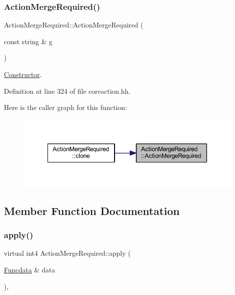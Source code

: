 \subsubsection{\texorpdfstring{ActionMergeRequired()}{ActionMergeRequired()}}
{\footnotesize\ttfamily Action\+Merge\+Required\+::\+Action\+Merge\+Required (\begin{DoxyParamCaption}\item[{const string \&}]{g }\end{DoxyParamCaption})\hspace{0.3cm}{\ttfamily [inline]}}



\mbox{\hyperlink{class_constructor}{Constructor}}. 



Definition at line 324 of file coreaction.\+hh.

Here is the caller graph for this function\+:
\nopagebreak
\begin{figure}[H]
\begin{center}
\leavevmode
\includegraphics[width=342pt]{class_action_merge_required_a7b06ab4857cfa0d3780e781312d6817a_icgraph}
\end{center}
\end{figure}


\subsection{Member Function Documentation}
\mbox{\label{class_action_merge_required_a2cee2e5fc759fbf5ba680f08bfb4d0e3}} 
\subsubsection{\texorpdfstring{apply()}{apply()}}
{\footnotesize\ttfamily virtual int4 Action\+Merge\+Required\+::apply (\begin{DoxyParamCaption}\item[{\mbox{\hyperlink{class_funcdata}{Funcdata}} \&}]{data }\end{DoxyParamCaption})\hspace{0.3cm}{\ttfamily [inline]}, {\ttfamily [virtual]}}



